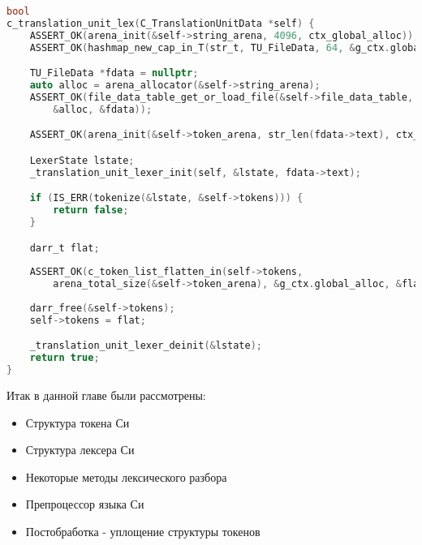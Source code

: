 \begin{lstlisting}[language=c, caption={Функция этапа лексического разбора}, label={lexing:pass-fn}]
bool
c_translation_unit_lex(C_TranslationUnitData *self) {
    ASSERT_OK(arena_init(&self->string_arena, 4096, ctx_global_alloc));
    ASSERT_OK(hashmap_new_cap_in_T(str_t, TU_FileData, 64, &g_ctx.global_alloc, &self->file_data_table));

    TU_FileData *fdata = nullptr;
    auto alloc = arena_allocator(&self->string_arena);
    ASSERT_OK(file_data_table_get_or_load_file(&self->file_data_table, self->main_file, nullptr, 
        &alloc, &fdata));

    ASSERT_OK(arena_init(&self->token_arena, str_len(fdata->text), ctx_global_alloc));

    LexerState lstate;
    _translation_unit_lexer_init(self, &lstate, fdata->text);

    if (IS_ERR(tokenize(&lstate, &self->tokens))) {
        return false;
    }

    darr_t flat;
    
    ASSERT_OK(c_token_list_flatten_in(self->tokens, 
        arena_total_size(&self->token_arena), &g_ctx.global_alloc, &flat));
    
    darr_free(&self->tokens);
    self->tokens = flat;

    _translation_unit_lexer_deinit(&lstate);
    return true;
}
\end{lstlisting}

Итак в данной главе были рассмотрены:
\begin{itemize}
  \item Структура токена Си
  \item Структура лексера Си
  \item Некоторые методы лексического разбора
  \item Препроцессор языка Си
  \item Постобработка - уплощение структуры токенов
\end{itemize}
